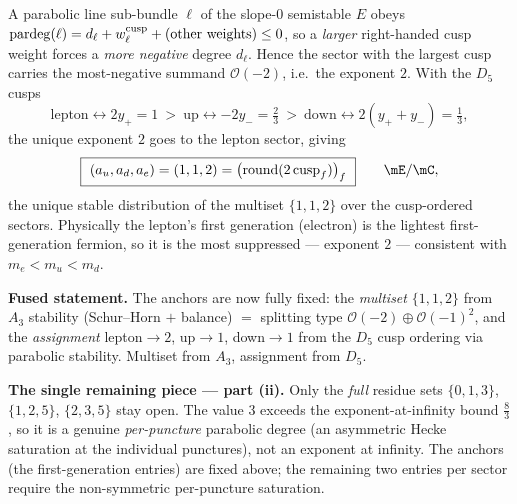 \begin{proposition}
A parabolic line sub-bundle $\ell$ of the slope-$0$ semistable $E$ obeys
$\operatorname{pardeg}(\ell)=d_\ell+w^{\mathrm{cusp}}_\ell+(\text{other weights})\le 0$, so a \emph{larger} right-handed
cusp weight forces a \emph{more negative} degree $d_\ell$. Hence the sector with the largest cusp carries
the most-negative summand $\mathcal O(-2)$, i.e.\ the exponent $2$. With the $D_5$ cusps
\[
  \text{lepton}\leftrightarrow 2y_+=1\ >\ \text{up}\leftrightarrow -2y_-=\tfrac23\ >\ \text{down}\leftrightarrow 2(y_++y_-)=\tfrac13 ,
\]
the unique exponent $2$ goes to the lepton sector, giving
\begin{equation}
  \boxed{\ (a_u,a_d,a_e)=(1,1,2)=\bigl(\operatorname{round}(2\,\mathrm{cusp}_f)\bigr)_f\ }\qquad\mE/\mC ,
\end{equation}
the unique stable distribution of the multiset $\{1,1,2\}$ over the cusp-ordered sectors. Physically the
lepton's first generation (electron) is the lightest first-generation fermion, so it is the most
suppressed --- exponent $2$ --- consistent with $m_e<m_u<m_d$.
\end{proposition}

\noindent\textbf{Fused statement.} The anchors are now fully fixed: the \emph{multiset} $\{1,1,2\}$ from
$A_3$ stability (Schur--Horn $+$ balance) $=$ splitting type $\mathcal O(-2)\oplus\mathcal O(-1)^2$, and
the \emph{assignment} lepton$\to2$, up$\to1$, down$\to1$ from the $D_5$ cusp ordering via parabolic
stability. Multiset from $A_3$, assignment from $D_5$.
\par\smallskip\noindent\textbf{The single remaining piece --- part (ii).}
Only the \emph{full} residue sets $\{0,1,3\}$, $\{1,2,5\}$, $\{2,3,5\}$ stay open. The value $3$ exceeds
the exponent-at-infinity bound $\tfrac83$, so it is a genuine \emph{per-puncture} parabolic degree (an
asymmetric Hecke saturation at the individual punctures), not an exponent at infinity. The anchors (the
first-generation entries) are fixed above; the remaining two entries per sector require the non-symmetric
per-puncture saturation. \mC
\par\smallskip

